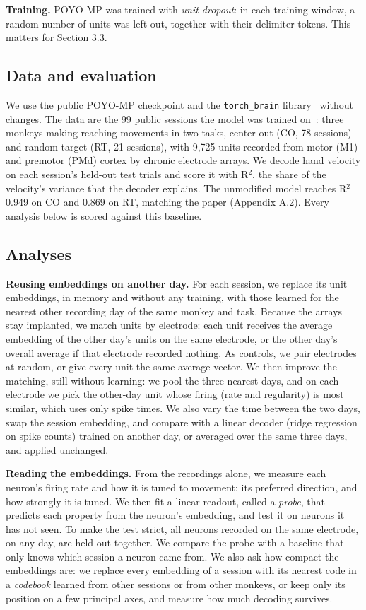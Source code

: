 \documentclass[11pt]{article}
\begin{document}
\textbf{Training.} POYO-MP was trained with \emph{unit dropout}: in each training window, a random number of units was left out, together with their delimiter tokens. This matters for Section 3.3.

\subsection{Data and evaluation}

We use the public POYO-MP checkpoint and the \texttt{torch\_brain} library~\cite{ref5} without changes. The data are the 99 public sessions the model was trained on~\cite{ref3}: three monkeys making reaching movements in two tasks, center-out (CO, 78 sessions) and random-target (RT, 21 sessions), with 9,725 units recorded from motor (M1) and premotor (PMd) cortex by chronic electrode arrays. We decode hand velocity on each session's held-out test trials and score it with R$^{2}$, the share of the velocity's variance that the decoder explains. The unmodified model reaches R$^{2}$ 0.949 on CO and 0.869 on RT, matching the paper (Appendix A.2). Every analysis below is scored against this baseline.

\subsection{Analyses}

\textbf{Reusing embeddings on another day.} For each session, we replace its unit embeddings, in memory and without any training, with those learned for the nearest other recording day of the same monkey and task. Because the arrays stay implanted, we match units by electrode: each unit receives the average embedding of the other day's units on the same electrode, or the other day's overall average if that electrode recorded nothing. As controls, we pair electrodes at random, or give every unit the same average vector. We then improve the matching, still without learning: we pool the three nearest days, and on each electrode we pick the other-day unit whose firing (rate and regularity) is most similar, which uses only spike times. We also vary the time between the two days, swap the session embedding, and compare with a linear decoder (ridge regression on spike counts) trained on another day, or averaged over the same three days, and applied unchanged.

\textbf{Reading the embeddings.} From the recordings alone, we measure each neuron's firing rate and how it is tuned to movement: its preferred direction, and how strongly it is tuned. We then fit a linear readout, called a \emph{probe}, that predicts each property from the neuron's embedding, and test it on neurons it has not seen. To make the test strict, all neurons recorded on the same electrode, on any day, are held out together. We compare the probe with a baseline that only knows which session a neuron came from. We also ask how compact the embeddings are: we replace every embedding of a session with its nearest code in a \emph{codebook} learned from other sessions or from other monkeys, or keep only its position on a few principal axes, and measure how much decoding survives.
\end{document}
